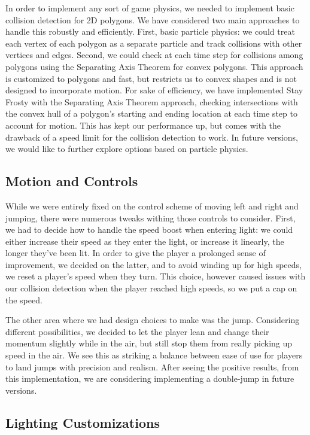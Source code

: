 \documentclass[11pt]{article} %
\begin{document}
In order to implement any sort of game physics, we needed to implement basic collision detection for 2D polygons.  We have considered two main approaches to handle this robustly and efficiently.  First, basic particle physics: we could treat each vertex of each polygon as a separate particle and track collisions with other vertices and edges.  Second, we could check at each time step for collisions among polygons using the Separating Axis Theorem for convex polygons.  This approach is customized to polygons and fast, but restricts us to convex shapes and is not designed to incorporate motion.  For sake of efficiency, we have implemented Stay Frosty with the Separating Axis Theorem approach, checking intersections with the convex hull of a polygon's starting and ending location at each time step to account for motion.  This has kept our performance up, but comes with the drawback of a speed limit for the collision detection to work.  In future versions, we would like to further explore options based on particle physics.

\subsection{Motion and Controls}

While we were entirely fixed on the control scheme of moving left and right and jumping, there were numerous tweaks withing those controls to consider.  First, we had to decide how to handle the speed boost when entering light: we could either increase their speed as they enter the light, or increase it linearly, the longer they've been lit.  In order to give the player a prolonged sense of improvement, we decided on the latter, and to avoid winding up for high speeds, we reset a player's speed when they turn.  This choice, however caused issues with our collision detection when the player reached high speeds, so we put a cap on the speed.  
\par The other area where we had design choices to make was the jump.  Considering different possibilities, we decided to let the player lean and change their momentum slightly while in the air, but still stop them from really picking up speed in the air.  We see this as striking a balance between ease of use for players to land jumps with precision and realism.  After seeing the positive results, from this implementation, we are considering implementing a double-jump in future versions.

\subsection{Lighting Customizations}
\end{document}
